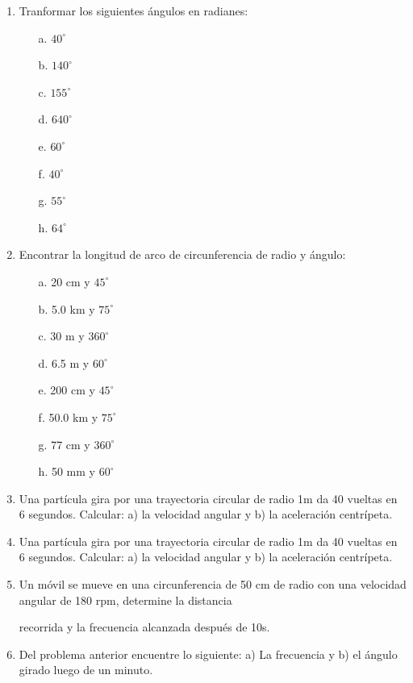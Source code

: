 \documentclass[a5paper,pagesize,10pt,bibtotoc,pointlessnumbers,
normalheadings,DIV=9,fleqn,x11names,table,twoside=false]{scrbook}
\begin{document}
\begin{enumerate}
\item Tranformar los siguientes ángulos en radianes:
\begin{itemize}
 \item[a.] $40^\circ$
 \item[b.] $140^\circ$
 \item[c.] $155^\circ$
 \item[d.] $640^\circ$
 \item[e.] $60^\circ$
 \item[f.] $40^\circ$
 \item[g.] $55^\circ$
 \item[h.] $64^\circ$
\end{itemize}

 \item Encontrar la longitud de arco de circunferencia de radio y ángulo:
\begin{itemize}
 \item[a.] 20 cm y $45^\circ$
 \item[b.] 5.0 km y $75^\circ$
 \item[c.] 30 m y $360^\circ$
 \item[d.] 6.5 m y $60^\circ$
  \item[e.] 200 cm y $45^\circ$
 \item[f.] 50.0 km y $75^\circ$
 \item[g.] 77 cm y $360^\circ$
 \item[h.] 50 mm y $60^\circ$
\end{itemize}

\item Una partícula gira por una trayectoria circular de radio 1m
 da 40 vueltas en 6 segundos. Calcular: a) la velocidad angular 
y b) la aceleración centrípeta.

\item  Una partícula gira por una trayectoria circular de radio 1m
 da 40 vueltas en 6 segundos. Calcular: a) la velocidad 
angular y b) la aceleración centrípeta.

\item  Un móvil se mueve en una
 circunferencia de 50 cm de radio con una velocidad angular de 180 rpm, determine la distancia

recorrida y la frecuencia alcanzada después de 10s.


\item  Del problema anterior encuentre lo siguiente: a) La frecuencia y b) el ángulo girado luego de
 un minuto.



\end{enumerate}
\end{document}
